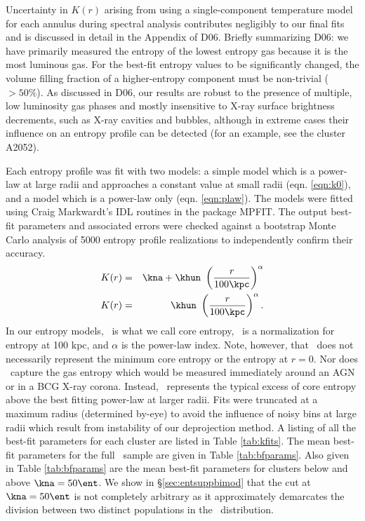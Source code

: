 Uncertainty in $K(r)$ arising from using a single-component
temperature model for each annulus during spectral analysis
contributes negligibly to our final fits and is discussed in detail in
the Appendix of D06. Briefly summarizing D06: we have primarily
measured the entropy of the lowest entropy gas because it is the most
luminous gas. For the best-fit entropy values to be significantly
changed, the volume filling fraction of a higher-entropy component
must be non-trivial ($> 50\%$). As discussed in D06, our results are
robust to the presence of multiple, low luminosity gas phases and
mostly insensitive to X-ray surface brightness decrements, such as
X-ray cavities and bubbles, although in extreme cases their influence
on an entropy profile can be detected (for an example, see the cluster
A2052).

Each entropy profile was fit with two models: a simple model which is
a power-law at large radii and approaches a constant value at small
radii (eqn. \ref{eqn:k0}), and a model which is a power-law only
(eqn. \ref{eqn:plaw}). The models were fitted using Craig Markwardt's
IDL routines in the package MPFIT. The output best-fit parameters and
associated errors were checked against a bootstrap Monte Carlo
analysis of 5000 entropy profile realizations to independently confirm
their accuracy.
\begin{eqnarray}
K(r) &=& \kna + \khun\ \left(\frac{r}{100 \kpc}\right)^{\alpha}\label{eqn:k0}\\
K(r) &=& \khun\ \left(\frac{r}{100 \kpc}\right)^{\alpha}\label{eqn:plaw}.
\end{eqnarray}
In our entropy models, \kna\ is what we call core entropy, \khun\ is a
normalization for entropy at 100 kpc, and $\alpha$ is the power-law
index. Note, however, that \kna\ does not necessarily represent the
minimum core entropy or the entropy at $r=0$. Nor does \kna\ capture
the gas entropy which would be measured immediately around an AGN or
in a BCG X-ray corona. Instead, \kna\ represents the typical excess of
core entropy above the best fitting power-law at larger radii. Fits
were truncated at a maximum radius (determined by-eye) to avoid the
influence of noisy bins at large radii which result from instability
of our deprojection method. A listing of all the best-fit parameters
for each cluster are listed in Table \ref{tab:kfits}. The mean
best-fit parameters for the full \accept\ sample are given in Table
\ref{tab:bfparams}. Also given in Table \ref{tab:bfparams} are the
mean best-fit parameters for clusters below and above $\kna = 50
\ent$. We show in \S\ref{sec:entsuppbimod} that the cut at $\kna=50
\ent$ is not completely arbitrary as it approximately demarcates the
division between two distinct populations in the \kna\ distribution.

